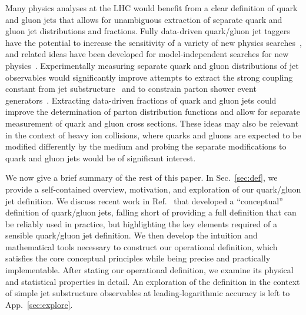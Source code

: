 \documentclass[letterpaper,11pt]{article}
\DeclareRobustCommand{\Sec}[1]{Sec.~\ref{#1}}
\DeclareRobustCommand{\App}[1]{App.~\ref{#1}}
\DeclareRobustCommand{\Ref}[1]{Ref.~\cite{#1}}
\begin{document}

Many physics analyses at the LHC would benefit from a clear definition of quark and gluon jets that allows for unambiguous extraction of separate quark and gluon jet distributions and fractions.
%
Fully data-driven quark/gluon jet taggers have the potential to increase the sensitivity of a variety of new physics searches~\cite{FerreiradeLima:2016gcz,Bhattacherjee:2016bpy}, and related ideas have been developed for model-independent searches for new physics~\cite{Collins:2018epr}.
%
Experimentally measuring separate quark and gluon distributions of jet observables would significantly improve attempts to extract the strong coupling constant from jet substructure~\cite{Bendavid:2018nar} and to constrain parton shower event generators~\cite{Reichelt:2017hts,Gras:2017jty}.
%
Extracting data-driven fractions of quark and gluon jets could improve the determination of parton distribution functions and allow for separate measurement of quark and gluon cross sections.
%
These ideas may also be relevant in the context of heavy ion collisions, where quarks and gluons are expected to be modified differently by the medium and probing the separate modifications to quark and gluon jets would be of significant interest.



We now give a brief summary of the rest of this paper.
%
In \Sec{sec:def}, we provide a self-contained overview, motivation, and exploration of our quark/gluon jet definition.
%
We discuss recent work in \Ref{Gras:2017jty} that developed a ``conceptual'' definition of quark/gluon jets, falling short of providing a full definition that can be reliably used in practice, but highlighting the key elements required of a sensible quark/gluon jet definition.
%
We then develop the intuition and mathematical tools necessary to construct our operational definition, which satisfies the core conceptual principles while being precise and practically implementable.
%
After stating our operational definition, we examine its physical and statistical properties in detail.
%
An exploration of the definition in the context of simple jet substructure observables at leading-logarithmic accuracy is left to \App{sec:explore}.
\end{document}
